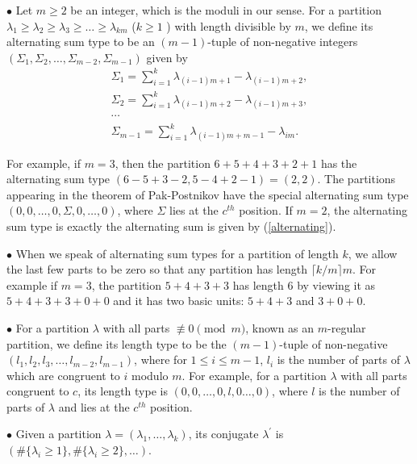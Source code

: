 \documentclass{amsart}
\begin{document}
$\bullet$ Let $m\geq 2$ be an integer, which is the moduli in our sense.  For a partition $\lambda_1\geq\lambda_2\geq\lambda_{3}\geq\dots\geq \lambda_{km}$ ($k\geq1$ ) with length divisible by $m$, we define its alternating sum type to be an $(m-1)$-tuple of non-negative integers $(\Sigma_{1},  \Sigma_{2},  \dots, \Sigma_{m-2},  \Sigma_{m-1})$ given by
\begin{gather*}
\Sigma_{1}=\sum_{i=1}^{k}\lambda_{(i-1)m+1}-\lambda_{(i-1)m+2},\\
 \Sigma_{2}=\sum_{i=1}^{k}\lambda_{(i-1)m+2}-\lambda_{(i-1)m+3},\\
   \cdots\\
    \Sigma_{m-1}=\sum_{i=1}^{k}\lambda_{(i-1)m+m-1}-\lambda_{im}.
\end{gather*}

For example, if $m=3$, then the partition $6+5+4+3+2+1$ has the alternating sum type $(6-5+3-2,5-4+2-1)=(2, 2)$. The partitions appearing in the theorem of Pak-Postnikov have the special alternating sum type $(0,0,\dots,0, \Sigma, 0,\dots,0)$, where $\Sigma$ lies at the $c^{th}$ position. If $m=2$, the alternating sum type is exactly the alternating sum is given by (\ref{alternating}). 



$\bullet$ When we speak of alternating sum types for a partition of length $k$, we allow the last few parts to be zero so that any partition has length $\lceil k/m \rceil m$. For example if $m=3$, the partition $5+4+3+3$ has length $6$ by viewing it as $5+4+3+3+0+0$ and it has two basic units: $5+4+3$ and $3+0+0.$

$\bullet$ For a partition $\lambda$ with all parts $\not\equiv 0\pmod m$, known as an $m$-regular partition, we define its length type to be the $(m-1)$-tuple of non-negative $(l_{1}, l_{2}, l_{3}, \dots, l_{m-2},  l_{m-1})$, where for $1\leq i\leq m-1$,  $l_{i}$ is the number of parts of $\lambda$ which are congruent to $i$ modulo $m$. For example, for a partition $\lambda$ with all parts congruent to $c$, its length type is $(0,0,\dots,0,l,0\dots,0)$, where $l$ is the number of parts of $\lambda$ and lies at the $c^{th}$ position.

$\bullet$ Given a partition $\lambda = (\lambda_1, \dots, \lambda_k)$, its conjugate $\lambda^\prime$ is $(\#\{\lambda_i \geq 1\},\#\{\lambda_i \geq 2\},\dots)$.
\end{document}

